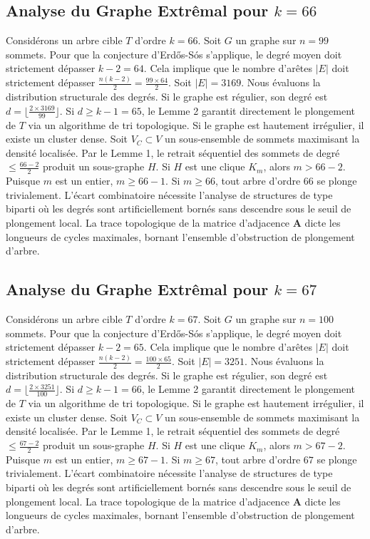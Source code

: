 \documentclass[11pt,a4paper]{article}
\begin{document}
\subsection{Analyse du Graphe Extr\^emal pour $k=66$}
Consid\'erons un arbre cible $T$ d'ordre $k=66$.
Soit $G$ un graphe sur $n=99$ sommets.
Pour que la conjecture d'Erd\H{o}s-S\'os s'applique, le degr\'e moyen doit strictement d\'epasser $k-2 = 64$.
Cela implique que le nombre d'ar\^etes $|E|$ doit strictement d\'epasser $\frac{n(k-2)}{2} = \frac{99 \times 64}{2}$.
Soit $|E| = 3169$.
Nous \'evaluons la distribution structurale des degr\'es. Si le graphe est r\'egulier, son degr\'e est $d = \lfloor \frac{2 \times 3169}{99} \rfloor$.
Si $d \geq k-1 = 65$, le Lemme 2 garantit directement le plongement de $T$ via un algorithme de tri topologique.
Si le graphe est hautement irr\'egulier, il existe un cluster dense. Soit $V_C \subset V$ un sous-ensemble de sommets maximisant la densit\'e localis\'ee.
Par le Lemme 1, le retrait s\'equentiel des sommets de degr\'e $\leq \frac{66-2}{2}$ produit un sous-graphe $H$.
Si $H$ est une clique $K_{m}$, alors $m > 66-2$. Puisque $m$ est un entier, $m \geq 66-1$. Si $m \geq 66$, tout arbre d'ordre $66$ se plonge trivialement.
L'\'ecart combinatoire n\'ecessite l'analyse de structures de type biparti o\`u les degr\'es sont artificiellement born\'es sans descendre sous le seuil de plongement local. La trace topologique de la matrice d'adjacence $\mathbf{A}$ dicte les longueurs de cycles maximales, bornant l'ensemble d'obstruction de plongement d'arbre.


\subsection{Analyse du Graphe Extr\^emal pour $k=67$}
Consid\'erons un arbre cible $T$ d'ordre $k=67$.
Soit $G$ un graphe sur $n=100$ sommets.
Pour que la conjecture d'Erd\H{o}s-S\'os s'applique, le degr\'e moyen doit strictement d\'epasser $k-2 = 65$.
Cela implique que le nombre d'ar\^etes $|E|$ doit strictement d\'epasser $\frac{n(k-2)}{2} = \frac{100 \times 65}{2}$.
Soit $|E| = 3251$.
Nous \'evaluons la distribution structurale des degr\'es. Si le graphe est r\'egulier, son degr\'e est $d = \lfloor \frac{2 \times 3251}{100} \rfloor$.
Si $d \geq k-1 = 66$, le Lemme 2 garantit directement le plongement de $T$ via un algorithme de tri topologique.
Si le graphe est hautement irr\'egulier, il existe un cluster dense. Soit $V_C \subset V$ un sous-ensemble de sommets maximisant la densit\'e localis\'ee.
Par le Lemme 1, le retrait s\'equentiel des sommets de degr\'e $\leq \frac{67-2}{2}$ produit un sous-graphe $H$.
Si $H$ est une clique $K_{m}$, alors $m > 67-2$. Puisque $m$ est un entier, $m \geq 67-1$. Si $m \geq 67$, tout arbre d'ordre $67$ se plonge trivialement.
L'\'ecart combinatoire n\'ecessite l'analyse de structures de type biparti o\`u les degr\'es sont artificiellement born\'es sans descendre sous le seuil de plongement local. La trace topologique de la matrice d'adjacence $\mathbf{A}$ dicte les longueurs de cycles maximales, bornant l'ensemble d'obstruction de plongement d'arbre.
\end{document}
